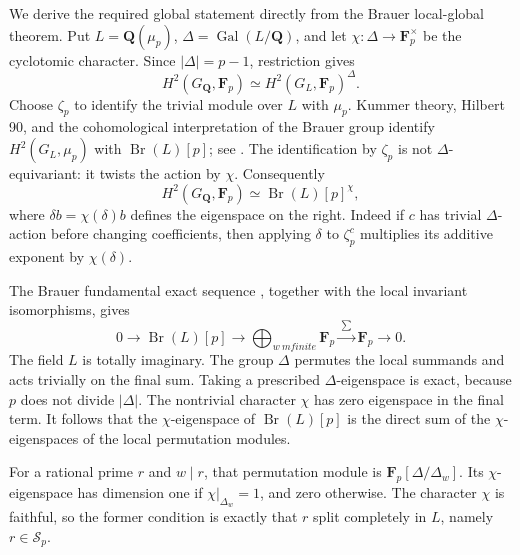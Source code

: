 We derive the required global statement directly from
the Brauer local-global theorem.  Put
\(L=\mathbf Q(\mu_p)\),
\(\Delta=\operatorname{Gal}(L/\mathbf Q)\), and let
\(\chi:\Delta\to\mathbf F_p^\times\) be the
cyclotomic character.  Since \(|\Delta|=p-1\),
restriction gives
\[
 H^2(G_{\mathbf Q},\mathbf F_p)
                     \simeq H^2(G_L,\mathbf F_p)^\Delta.
\]
Choose \(\zeta_p\) to identify the trivial module over
\(L\) with \(\mu_p\).  Kummer theory, Hilbert 90,
and the cohomological interpretation of the Brauer
group identify \(H^2(G_L,\mu_p)\) with
\(\operatorname{Br}(L)[p]\); see
\cite[II, Proposition~1.22; IV, Theorem~3.14,
p.~137]{MilneCFT}.
The identification by \(\zeta_p\) is not
\(\Delta\)-equivariant: it twists the action by
\(\chi\).  Consequently
\begin{equation}\label{eq:odd-target-brauer-eigenspace}
 H^2(G_{\mathbf Q},\mathbf F_p)
              \simeq\operatorname{Br}(L)[p]^{\chi},
\end{equation}
where \(\delta b=\chi(\delta)b\) defines the
eigenspace on the right.  Indeed if \(c\) has trivial
\(\Delta\)-action before changing coefficients,
then applying \(\delta\) to \(\zeta_p^c\) multiplies
its additive exponent by \(\chi(\delta)\).

The Brauer fundamental exact sequence
\cite[VIII, Theorem~4.2, p.~241]{MilneCFT}, together
with the local invariant isomorphisms, gives
\begin{equation}\label{eq:odd-target-brauer-exact}
 0\longrightarrow\operatorname{Br}(L)[p]
       \longrightarrow\bigoplus_{w\ {
m finite}}\mathbf F_p
       \xrightarrow{\ \sum\ }\mathbf F_p\longrightarrow0.
\end{equation}
The field \(L\) is totally imaginary.  The group
\(\Delta\) permutes the local summands and acts
trivially on the final sum.  Taking a prescribed
\(\Delta\)-eigenspace is exact, because \(p\) does
not divide \(|\Delta|\).  The nontrivial character
\(\chi\) has zero eigenspace in the final term.
It follows that the \(\chi\)-eigenspace of
\(\operatorname{Br}(L)[p]\) is the direct sum of
the \(\chi\)-eigenspaces of the local permutation
modules.

For a rational prime \(r\) and \(w\mid r\), that
permutation module is \(\mathbf F_p[\Delta/\Delta_w]\).
Its \(\chi\)-eigenspace has dimension one if
\(\chi|_{\Delta_w}=1\), and zero otherwise.
The character \(\chi\) is faithful, so the former
condition is exactly that \(r\) split completely
in \(L\), namely \(r\in\mathcal S_p\).

